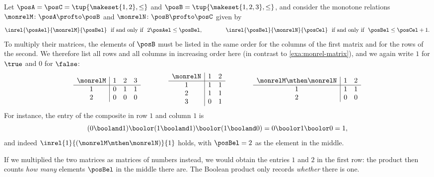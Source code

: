 \begin{example}
    \label{exa:monrel-matrix-multiplication}
    Let $\posA = \posC = \tup{\makeset{1, 2}, \leq}$ and $\posB = \tup{\makeset{1, 2, 3}, \leq}$, and consider the monotone relations $\monrelM \colon \posA \profto \posB$ and $\monrelN \colon \posB \profto \posC$ given by
    \begin{equation}
        \inrel{\posAel}{\monrelM}{\posBel} \ \text{ if and only if } \ 2 \posAel \leq \posBel,
        \qquad \qquad
        \inrel{\posBel}{\monrelN}{\posCel} \ \text{ if and only if } \ \posBel \leq \posCel + 1.
    \end{equation}
    To multiply their matrices, the elements of $\posB$ must be listed in the same order for the columns of the first matrix and for the rows of the second.
    We therefore list all rows and all columns in increasing order here (in contrast to \cref{exa:monrel-matrix}), and we again write $1$ for $\true$ and $0$ for $\false$:
    \begin{equation}
        \begin{array}{c|ccc}
            \monrelM & 1 & 2 & 3 \\ \hline
            1        & 0 & 1 & 1 \\
            2        & 0 & 0 & 0
        \end{array}
        \qquad \qquad
        \begin{array}{c|cc}
            \monrelN & 1 & 2 \\ \hline
            1        & 1 & 1 \\
            2        & 1 & 1 \\
            3        & 0 & 1
        \end{array}
        \qquad \qquad
        \begin{array}{c|cc}
            \monrelM \mthen \monrelN & 1 & 2 \\ \hline
            1                        & 1 & 1 \\
            2                        & 0 & 0
        \end{array}
    \end{equation}
    For instance, the entry of the composite in row $1$ and column $1$ is
    \begin{equation}
        (0 \booland 1) \boolor (1 \booland 1) \boolor (1 \booland 0) = 0 \boolor 1 \boolor 0 = 1,
    \end{equation}
    and indeed $\inrel{1}{(\monrelM \mthen \monrelN)}{1}$ holds, with $\posBel = 2$ as the element in the middle.

    If we multiplied the two matrices as matrices of numbers instead, we would obtain the entries $1$ and $2$ in the first row: the product then counts \emph{how many} elements $\posBel$ in the middle there are.
    The Boolean product only records \emph{whether} there is one.
\end{example}

